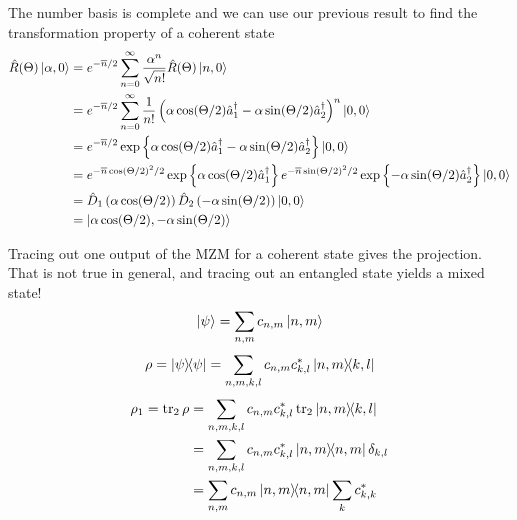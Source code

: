 The number basis is complete and we can use our previous result to find the transformation property of a coherent state
\begin{equation}
	\begin{split}
		\hat{R}(\Theta)
		\ket{\alpha,0}
		&=
		e^{-\overline{n}/2}
		\sum_{n=0}^\infty
		\frac{\alpha^n}{\sqrt{n!}}
		\hat{R}(\Theta)
		\ket{n,0}
		\\
		&=
		e^{-\overline{n}/2}
		\sum_{n=0}^\infty
		\frac{1}{n!}
		\left(
			\alpha
			\cos(\Theta/2)
			\hat{a}_1^\dagger
			-
			\alpha
			\sin(\Theta/2)
			\hat{a}_2^\dagger
		\right)^n
		\ket{0,0}
		\\
		&=
		e^{-\overline{n}/2}
		\exp\left\{
			\alpha
			\cos(\Theta/2)
			\hat{a}_1^\dagger
			-
			\alpha
			\sin(\Theta/2)
			\hat{a}_2^\dagger
		\right\}
		\ket{0,0}
		\\
		&=
		e^{-\overline{n}\cos(\Theta/2)^2/2}
		\exp\left\{
			\alpha
			\cos(\Theta/2)
			\hat{a}_1^\dagger
		\right\}
		e^{-\overline{n}\sin(\Theta/2)^2/2}
		\exp\left\{
			-
			\alpha
			\sin(\Theta/2)
			\hat{a}_2^\dagger
		\right\}
		\ket{0,0}
		\\
		&=
		\hat{D}_1\left(
			\alpha
			\cos(\Theta/2)
		\right)
		\hat{D}_2\left(
			-
			\alpha
			\sin(\Theta/2)
		\right)
		\ket{0,0}
		\\
		&=
		\ket{\alpha\cos(\Theta/2),-\alpha\sin(\Theta/2)}
	\end{split}
\end{equation}

Tracing out one output of the MZM for a coherent state gives the projection.
That is not true in general, and tracing out an entangled state yields a mixed state!
\begin{equation}
	\ket{\psi}
	=
	\sum_{n,m}
	c_{n,m}
	\ket{n,m}
\end{equation}
\begin{equation}
	\rho
	=
	\ketbra{\psi}
	=
	\sum_{n,m,k,l}
	c_{n,m}
	c_{k,l}^*
	\ketbra{n,m}{k,l}
\end{equation}
\begin{equation}
	\begin{split}
		\rho_1
		=
		\tr_2\rho
		&=
		\sum_{n,m,k,l}
		c_{n,m}
		c_{k,l}^*
		\tr_2\ketbra{n,m}{k,l}
		\\
		&=
		\sum_{n,m,k,l}
		c_{n,m}
		c_{k,l}^*
		\ketbra{n,m}
		\delta_{k,l}
		\\
		&=
		\sum_{n,m}
		c_{n,m}
		\ketbra{n,m}
		\sum_k
		c_{k,k}^*
	\end{split}
\end{equation}

